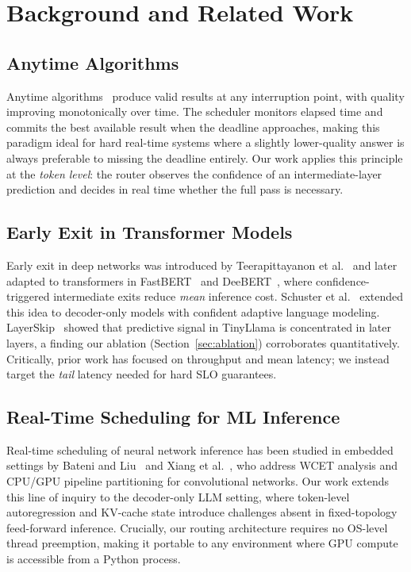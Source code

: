\documentclass[conference]{IEEEtran}
\begin{document}
\section{Background and Related Work}

\subsection{Anytime Algorithms}

Anytime algorithms~\cite{zilberstein1996using,boddy1994deliberation}
produce valid results at any interruption point, with quality improving
monotonically over time.
The scheduler monitors elapsed time and commits the best available result
when the deadline approaches, making this paradigm ideal for hard real-time
systems where a slightly lower-quality answer is always preferable to
missing the deadline entirely.
Our work applies this principle at the \emph{token level}: the router
observes the confidence of an intermediate-layer prediction and decides
in real time whether the full pass is necessary.

\subsection{Early Exit in Transformer Models}

Early exit in deep networks was introduced by
Teerapittayanon et al.~\cite{teerapittayanon2016branchynet} and later
adapted to transformers in FastBERT~\cite{liu2020fastbert} and
DeeBERT~\cite{xin2020deebert}, where confidence-triggered intermediate
exits reduce \emph{mean} inference cost.
Schuster et al.~\cite{schuster2022confident} extended this idea to
decoder-only models with confident adaptive language modeling.
LayerSkip~\cite{elhoushi2024layerskip} showed that predictive signal
in TinyLlama is concentrated in later layers, a finding our ablation
(Section~\ref{sec:ablation}) corroborates quantitatively.
Critically, prior work has focused on throughput and mean latency;
we instead target the \emph{tail} latency needed for hard SLO guarantees.

\subsection{Real-Time Scheduling for ML Inference}

Real-time scheduling of neural network inference has been studied in
embedded settings by Bateni and Liu~\cite{bateni2020neuos} and
Xiang et al.~\cite{xiang2019pipelined}, who address WCET analysis and
CPU/GPU pipeline partitioning for convolutional networks.
Our work extends this line of inquiry to the decoder-only LLM setting,
where token-level autoregression and KV-cache state introduce
challenges absent in fixed-topology feed-forward inference.
Crucially, our routing architecture requires no OS-level thread
preemption, making it portable to any environment where GPU compute is
accessible from a Python process.
\end{document}
